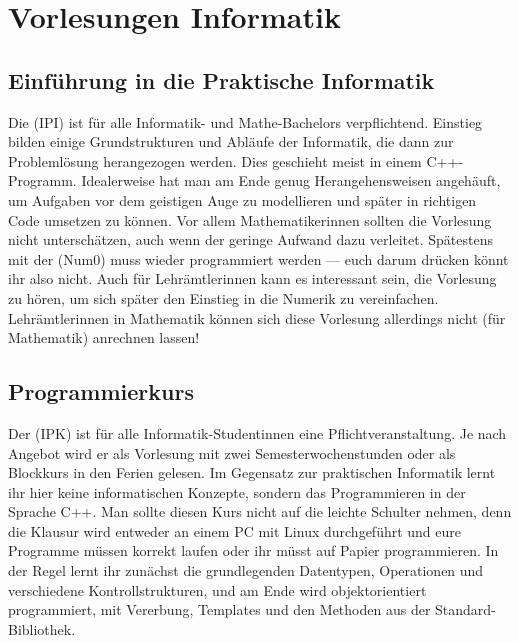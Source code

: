 \section*{Vorlesungen Informatik}

\subsection{Einführung in die Praktische Informatik}
\label{info1}
Die  (\gls{IPI}) ist für alle Informatik- und Mathe-Bachelors verpflichtend. Einstieg bilden einige Grundstrukturen und Abläufe der Informatik, die dann zur Problemlösung herangezogen werden. Dies geschieht meist in einem C++-Programm. Idealerweise hat man am Ende genug Herangehensweisen angehäuft, um Aufgaben vor dem geistigen Auge zu modellieren und später in richtigen Code umsetzen zu können. Vor allem Mathematikerinnen sollten die Vorlesung nicht unterschätzen, auch wenn der geringe Aufwand dazu verleitet. Spätestens mit der  (\gls{Num0}) muss wieder programmiert werden --- euch darum drücken könnt ihr also nicht. Auch für Lehrämtlerinnen kann es interessant sein, die Vorlesung zu hören, um sich später den Einstieg in die Numerik zu vereinfachen. Lehrämtlerinnen in Mathematik können sich diese Vorlesung allerdings nicht (für Mathematik) anrechnen lassen!

\vspace{-3mm}
\subsection{Programmierkurs}
\label{ipk}
Der  (\gls{IPK}) ist für alle Informatik-Studentinnen eine Pflichtveranstaltung. Je nach Angebot wird er als Vorlesung mit zwei Semesterwochenstunden oder als Blockkurs in den Ferien gelesen. Im Gegensatz zur praktischen Informatik lernt ihr hier keine informatischen Konzepte, sondern das Programmieren in der Sprache C++. Man sollte diesen Kurs nicht auf die leichte Schulter nehmen, denn die Klausur wird entweder an einem PC mit Linux durchgeführt und eure Programme müssen korrekt laufen oder ihr müsst auf Papier programmieren. In der Regel lernt ihr zunächst die grundlegenden Datentypen, Operationen und verschiedene Kontrollstrukturen, und am Ende wird objektorientiert programmiert, \zB mit Vererbung, Templates und den Methoden aus der Standard-Bibliothek.

\vspace{-3mm}
